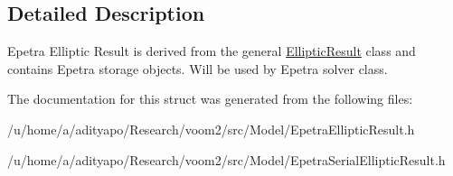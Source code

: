 \subsection{Detailed Description}
Epetra Elliptic Result is derived from the general \hyperlink{structvoom_1_1_elliptic_result}{EllipticResult} class and contains Epetra storage objects. Will be used by Epetra solver class. 

The documentation for this struct was generated from the following files:\begin{DoxyCompactItemize}
\item 
/u/home/a/adityapo/Research/voom2/src/Model/EpetraEllipticResult.h\item 
/u/home/a/adityapo/Research/voom2/src/Model/EpetraSerialEllipticResult.h\end{DoxyCompactItemize}
